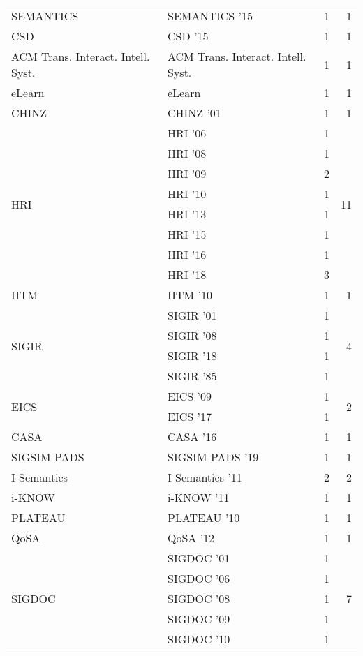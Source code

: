 \begin{table*}[t]
\begin{tabular}{llrr}
\multirow{1}{*}{SEMANTICS } & SEMANTICS '15 & 1 & \multirow{1}{*}{1}\\
\multirow{1}{*}{CSD } & CSD '15 & 1 & \multirow{1}{*}{1}\\
\multirow{1}{*}{ACM Trans. Interact. Intell. Syst.} & ACM Trans. Interact. Intell. Syst. & 1 & \multirow{1}{*}{1}\\
\multirow{1}{*}{eLearn} & eLearn & 1 & \multirow{1}{*}{1}\\
\multirow{1}{*}{CHINZ } & CHINZ '01 & 1 & \multirow{1}{*}{1}\\
\multirow{8}{*}{HRI } & HRI '06 & 1 & \multirow{8}{*}{11}\\
& HRI '08 & 1 &\\
& HRI '09 & 2 &\\
& HRI '10 & 1 &\\
& HRI '13 & 1 &\\
& HRI '15 & 1 &\\
& HRI '16 & 1 &\\
& HRI '18 & 3 &\\
\multirow{1}{*}{IITM } & IITM '10 & 1 & \multirow{1}{*}{1}\\
\multirow{4}{*}{SIGIR } & SIGIR '01 & 1 & \multirow{4}{*}{4}\\
& SIGIR '08 & 1 &\\
& SIGIR '18 & 1 &\\
& SIGIR '85 & 1 &\\
\multirow{2}{*}{EICS } & EICS '09 & 1 & \multirow{2}{*}{2}\\
& EICS '17 & 1 &\\
\multirow{1}{*}{CASA } & CASA '16 & 1 & \multirow{1}{*}{1}\\
\multirow{1}{*}{SIGSIM-PADS } & SIGSIM-PADS '19 & 1 & \multirow{1}{*}{1}\\
\multirow{1}{*}{I-Semantics } & I-Semantics '11 & 2 & \multirow{1}{*}{2}\\
\multirow{1}{*}{i-KNOW } & i-KNOW '11 & 1 & \multirow{1}{*}{1}\\
\multirow{1}{*}{PLATEAU } & PLATEAU '10 & 1 & \multirow{1}{*}{1}\\
\multirow{1}{*}{QoSA } & QoSA '12 & 1 & \multirow{1}{*}{1}\\
\multirow{7}{*}{SIGDOC } & SIGDOC '01 & 1 & \multirow{7}{*}{7}\\
& SIGDOC '06 & 1 &\\
& SIGDOC '08 & 1 &\\
& SIGDOC '09 & 1 &\\
& SIGDOC '10 & 1 &\\

\end{tabular}
\end{table*}
